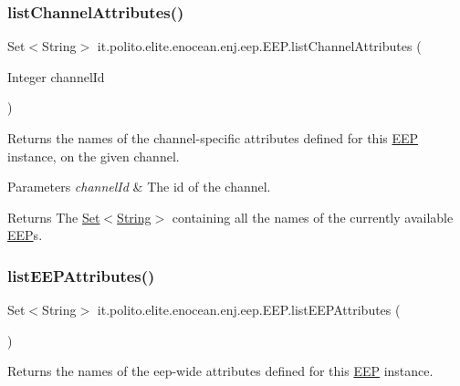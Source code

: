 \subsubsection{\texorpdfstring{list\+Channel\+Attributes()}{listChannelAttributes()}}
{\footnotesize\ttfamily Set$<$String$>$ it.\+polito.\+elite.\+enocean.\+enj.\+eep.\+E\+E\+P.\+list\+Channel\+Attributes (\begin{DoxyParamCaption}\item[{Integer}]{channel\+Id }\end{DoxyParamCaption})}

Returns the names of the channel-\/specific attributes defined for this \hyperlink{classit_1_1polito_1_1elite_1_1enocean_1_1enj_1_1eep_1_1_e_e_p}{E\+EP} instance, on the given channel.


\begin{DoxyParams}{Parameters}
{\em channel\+Id} & The id of the channel. \\
\hline
\end{DoxyParams}
\begin{DoxyReturn}{Returns}
The \hyperlink{}{Set}$<$\hyperlink{}{String}$>$ containing all the names of the currently available \hyperlink{classit_1_1polito_1_1elite_1_1enocean_1_1enj_1_1eep_1_1_e_e_p}{E\+EP}s. 
\end{DoxyReturn}
\hypertarget{classit_1_1polito_1_1elite_1_1enocean_1_1enj_1_1eep_1_1_e_e_p_a466e8fb47d88c6d56c647b3dd0202b18}{}\label{classit_1_1polito_1_1elite_1_1enocean_1_1enj_1_1eep_1_1_e_e_p_a466e8fb47d88c6d56c647b3dd0202b18} 
\subsubsection{\texorpdfstring{list\+E\+E\+P\+Attributes()}{listEEPAttributes()}}
{\footnotesize\ttfamily Set$<$String$>$ it.\+polito.\+elite.\+enocean.\+enj.\+eep.\+E\+E\+P.\+list\+E\+E\+P\+Attributes (\begin{DoxyParamCaption}{ }\end{DoxyParamCaption})}

Returns the names of the eep-\/wide attributes defined for this \hyperlink{classit_1_1polito_1_1elite_1_1enocean_1_1enj_1_1eep_1_1_e_e_p}{E\+EP} instance.

